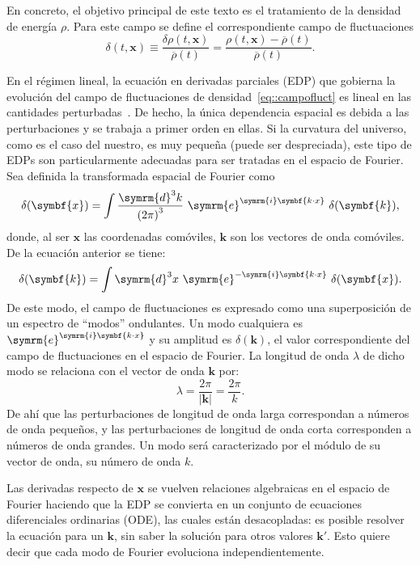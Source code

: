 En concreto, el objetivo principal de este texto es el tratamiento de la densidad de energía \(\rho\). Para este campo se define el correspondiente campo de fluctuaciones
\begin{equation}
    \delta(t,\symbf{x})\equiv\frac{\delta\rho(t,\symbf{x})}{\overbar{\rho}(t)}=\frac{\rho(t,\symbf{x})-\overbar{\rho}(t)}{\overbar{\rho}(t)}.\label{eq::campofluct}
\end{equation}

En el régimen lineal, la ecuación en derivadas parciales (EDP) que gobierna la evolución del campo de fluctuaciones de densidad~\ref{eq::campofluct} es lineal en las cantidades perturbadas~\cite{mo_van}. De hecho, la única dependencia espacial es debida a las perturbaciones y se trabaja a primer orden en ellas. Si la curvatura del universo, como es el caso del nuestro, es muy pequeña (puede ser despreciada), este tipo de EDPs son particularmente adecuadas para ser tratadas en el espacio de Fourier. Sea definida la transformada espacial de Fourier como
\begin{equation}
    \delta(\symbf{x})=\int\frac{\symrm{d}^3 k}{\left(2\pi\right)^3}\ \symrm{e}^{\symrm{i}\symbf{k\cdot x}}\ \delta(\symbf{k}),\label{eq::fourier}
\end{equation}
donde, al ser \(\symbf{x}\) las coordenadas comóviles, \(\symbf{k}\) son los vectores de onda comóviles. De la ecuación anterior se tiene:
\begin{equation}
    \delta(\symbf{k})=\int\symrm{d}^3 x\ \symrm{e}^{-\symrm{i}\symbf{k\cdot x}}\ \delta(\symbf{x}).
\end{equation}
De este modo, el campo de fluctuaciones es expresado como una superposición de un espectro de ``modos'' ondulantes. Un modo cualquiera es \(\symrm{e}^{\symrm{i}\symbf{k\cdot x}}\) y su amplitud es \(\delta(\symbf{k})\), el valor correspondiente del campo de fluctuaciones en el espacio de Fourier. La longitud de onda \(\lambda\) de dicho modo se relaciona con el vector de onda \(\symbf{k}\) por:
\begin{equation}
    \lambda=\frac{2\pi}{\left|\symbf{k}\right|}=\frac{2\pi}{k}.
\end{equation}
De ahí que las perturbaciones de longitud de onda larga correspondan a números de onda pequeños, y las perturbaciones de longitud de onda corta corresponden a números de onda grandes. Un modo será caracterizado por el módulo de su vector de onda, su número de onda \(k\).

Las derivadas respecto de \(\symbf{x}\) se vuelven relaciones algebraicas en el espacio de Fourier haciendo que la EDP se convierta en un conjunto de ecuaciones diferenciales ordinarias (ODE), las cuales están desacopladas: es posible resolver la ecuación para un \(\symbf{k}\), sin saber la solución para otros valores \(\symbf{k}'\). Esto quiere decir que cada modo de Fourier evoluciona independientemente.
